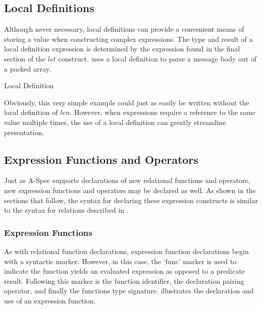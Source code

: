 \documentclass[letterpaper,10pt,draft]{book}
\begin{document}
\subsection{Local Definitions}
   \label{sect:LetExpr}

Although never necessary, local definitions can provide a convenient means of storing
a value when constructing complex expressions.  The type and result of a local definition
expression is determined by the expression found in the final section of the $let$
construct.   uses a local definition to parse a message body out
of a packed array.

\begin{example}
\begin{minipage}[t]{0.49\linewidth}
   
\end{minipage}
\begin{minipage}[t]{0.49\linewidth}
   \azed
   
\end{minipage}

   \caption{Local Definition}
   \label{ex:LetExpr}
\end{example}

Obviously, this very simple example could just as easily be written without the
local definition of $len$.  However, when expressions require a reference to the
same value multiple times, the use of a local definition can greatly streamline
presentation.

\subsection{Expression Functions and Operators}
   \label{sect:ExprFuncOp}

Just as A-Spec supports declarations of new relational functions and operators,
new expression functions and operators may be declared as well.  As shown in the
sections that follow, the syntax for declaring these expression constructs is similar
to the syntax for relations described in .

\subsubsection{Expression Functions}
   \label{sect:ExprFunc}

As with relational function declarations, expression function declarations begin
with a syntactic marker.  However, in this case, the `func' marker is used to indicate
the function yields an evaluated expression as opposed to a predicate result.  Following
this marker is the function identifier, the declaration pairing operator, and finally
the functions type signature.   illustrates the declaration and
use of an expression function.
\end{document}
